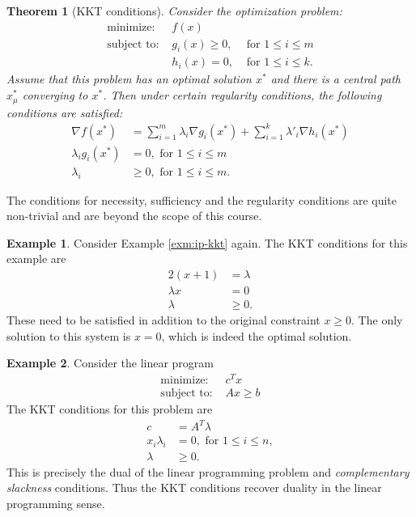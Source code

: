 \documentclass[
]{book}
\newtheorem{theorem}{Theorem}[chapter]
\theoremstyle{definition}
\theoremstyle{definition}
\newtheorem{example}{Example}[chapter]
\theoremstyle{definition}
\theoremstyle{definition}
\theoremstyle{remark}
\begin{document}
\begin{theorem}[KKT conditions]
\protect\hypertarget{thm:kkt-conditions}{}\label{thm:kkt-conditions}Consider the optimization problem:
\begin{equation*}
  \begin{array}{llr}
    \mbox{minimize: } & f(x) \\
    \mbox{subject to: } 
      & g_i(x) \ge 0, & \mbox{ for } 1 \le i \le m \\
      & h_i(x) = 0, & \mbox{ for } 1 \le i \le k.
  \end{array}
\end{equation*}
Assume that this problem has an optimal solution \(x^*\) and there is a central path \(x_\mu^*\) converging to \(x^*\).
Then under certain regularity conditions, the following conditions are satisfied:
\begin{align*}
  \nabla f(x^*) &= \sum \limits_{i = 1}^m \lambda_i \nabla g_i (x^*) 
  + \sum \limits_{i = 1}^k \lambda'_i \nabla h_i (x^*) \\
  \lambda_i g_i(x^*) &= 0, \mbox{ for } 1 \le i \le m \\
  \lambda_i &\ge 0, \mbox{ for } 1 \le i \le m.
\end{align*}
\end{theorem}

The conditions for necessity, sufficiency and the regularity conditions are quite non-trivial and are beyond the scope of this course.

\begin{example}
Consider Example \ref{exm:ip-kkt} again. The KKT conditions for this example are
\begin{align*}
  2(x + 1) &= \lambda \\
  \lambda x &= 0 \\
  \lambda &\ge 0.
\end{align*}
These need to be satisfied in addition to the original constraint \(x \ge 0\). The only solution to this system is \(x = 0\), which is indeed the optimal solution.
\end{example}

\begin{example}
Consider the linear program
\begin{align*}
  \mbox{minimize: } & c^T x \\
  \mbox{subject to: } & Ax \ge b 
\end{align*}
The KKT conditions for this problem are
\begin{align*}
  c &= A^T \lambda \\
  x_i \lambda _i &= 0, \mbox{ for } 1 \le i \le n,\\
  \lambda &\ge 0.
\end{align*}
This is precisely the dual of the linear programming problem and \emph{complementary slackness} conditions.
Thus the KKT conditions recover duality in the linear programming sense.
\end{example}
\end{document}
